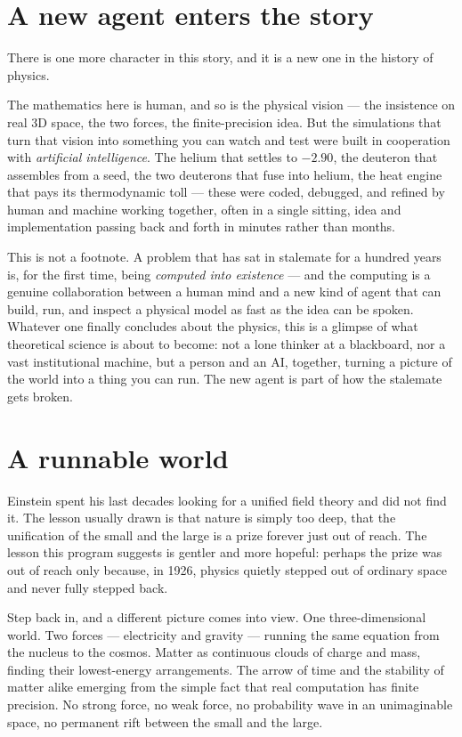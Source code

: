 \documentclass[11pt]{article}
\begin{document}
\section*{A new agent enters the story}

There is one more character in this story, and it is a new one in the history of physics.

The mathematics here is human, and so is the physical vision --- the insistence on real 3D space,
the two forces, the finite-precision idea. But the simulations that turn that vision into something
you can watch and test were built in cooperation with \emph{artificial intelligence}. The helium
that settles to $-2.90$, the deuteron that assembles from a seed, the two deuterons that fuse into
helium, the heat engine that pays its thermodynamic toll --- these were coded, debugged, and refined
by human and machine working together, often in a single sitting, idea and implementation passing
back and forth in minutes rather than months.

This is not a footnote. A problem that has sat in stalemate for a hundred years is, for the first
time, being \emph{computed into existence} --- and the computing is a genuine collaboration between
a human mind and a new kind of agent that can build, run, and inspect a physical model as fast as
the idea can be spoken. Whatever one finally concludes about the physics, this is a glimpse of what
theoretical science is about to become: not a lone thinker at a blackboard, nor a vast institutional
machine, but a person and an AI, together, turning a picture of the world into a thing you can run.
The new agent is part of how the stalemate gets broken.

\section*{A runnable world}

Einstein spent his last decades looking for a unified field theory and did not find it. The lesson
usually drawn is that nature is simply too deep, that the unification of the small and the large is
a prize forever just out of reach. The lesson this program suggests is gentler and more hopeful:
perhaps the prize was out of reach only because, in 1926, physics quietly stepped out of ordinary
space and never fully stepped back.

Step back in, and a different picture comes into view. One three-dimensional world. Two forces ---
electricity and gravity --- running the same equation from the nucleus to the cosmos. Matter as
continuous clouds of charge and mass, finding their lowest-energy arrangements. The arrow of time
and the stability of matter alike emerging from the simple fact that real computation has finite
precision. No strong force, no weak force, no probability wave in an unimaginable space, no
permanent rift between the small and the large.
\end{document}

